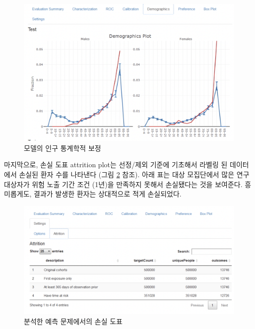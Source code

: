 \documentclass[10.5pt]{book}
\theoremstyle{definition}
\theoremstyle{definition}
\theoremstyle{definition}
\theoremstyle{remark}
\begin{document}
\begin{figure}

{\centering \includegraphics[width=1\linewidth]{images/PatientLevelPrediction/shiny/singleShiny/singleShinyDemo} 

}

\caption{모델의 인구 통계학적 보정}\label{fig:shinyDemo}
\end{figure}

마지막으로, 손실 도표 attrition plot는 선정/제외 기준에 기초해서 라벨링
된 데이터에서 손실된 환자 수를 나타낸다 (그림 \ref{fig:shinyAtt} 참조).
아래 표는 대상 모집단에서 많은 연구대상자가 위험 노출 기간 조건 (1년)을
만족하지 못해서 손실됐다는 것을 보여준다. 흥미롭게도, 결과가 발생한
환자는 상대적으로 적게 손실되었다.

\begin{figure}

{\centering \includegraphics[width=1\linewidth]{images/PatientLevelPrediction/shiny/singleShiny/singleShinyAtt} 

}

\caption{분석한 예측 문제에서의 손실 도표}\label{fig:shinyAtt}
\end{figure}
\end{document}
